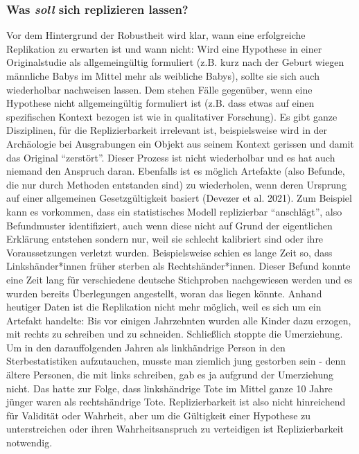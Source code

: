 \documentclass[
  letterpaper,
  DIV=11,
  numbers=noendperiod]{scrreprt}
\begin{document}
\subsubsection{\texorpdfstring{Was \emph{soll} sich replizieren
lassen?}{Was soll sich replizieren lassen?}}\label{was-soll-sich-replizieren-lassen}

Vor dem Hintergrund der Robustheit wird klar, wann eine erfolgreiche
Replikation zu erwarten ist und wann nicht: Wird eine Hypothese in einer
Originalstudie als allgemeingültig formuliert (z.B. kurz nach der Geburt
wiegen männliche Babys im Mittel mehr als weibliche Babys), sollte sie
sich auch wiederholbar nachweisen lassen. Dem stehen Fälle gegenüber,
wenn eine Hypothese nicht allgemeingültig formuliert ist (z.B. dass
etwas auf einen spezifischen Kontext bezogen ist wie in qualitativer
Forschung). Es gibt ganze Disziplinen, für die Replizierbarkeit
irrelevant ist, beispielsweise wird in der Archäologie bei Ausgrabungen
ein Objekt aus seinem Kontext gerissen und damit das Original
``zerstört''. Dieser Prozess ist nicht wiederholbar und es hat auch
niemand den Anspruch daran. Ebenfalls ist es möglich Artefakte (also
Befunde, die nur durch Methoden entstanden sind) zu wiederholen, wenn
deren Ursprung auf einer allgemeinen Gesetzgültigkeit basiert (Devezer
et al. 2021). Zum Beispiel kann es vorkommen, dass ein statistisches
Modell replizierbar ``anschlägt'', also Befundmuster identifiziert, auch
wenn diese nicht auf Grund der eigentlichen Erklärung entstehen sondern
nur, weil sie schlecht kalibriert sind oder ihre Voraussetzungen
verletzt wurden. Beispielsweise schien es lange Zeit so, dass
Linkshänder*innen früher sterben als Rechtshänder*innen. Dieser Befund
konnte eine Zeit lang für verschiedene deutsche Stichproben nachgewiesen
werden und es wurden bereits Überlegungen angestellt, woran das liegen
könnte. Anhand heutiger Daten ist die Replikation nicht mehr möglich,
weil es sich um ein Artefakt handelte: Bis vor einigen Jahrzehnten
wurden alle Kinder dazu erzogen, mit rechts zu schreiben und zu
schneiden. Schließlich stoppte die Umerziehung. Um in den
darauffolgenden Jahren als linkhändrige Person in den Sterbestatistiken
aufzutauchen, musste man ziemlich jung gestorben sein - denn ältere
Personen, die mit links schreiben, gab es ja aufgrund der Umerziehung
nicht. Das hatte zur Folge, dass linkshändrige Tote im Mittel ganze 10
Jahre jünger waren als rechtshändrige Tote. Replizierbarkeit ist also
nicht hinreichend für Validität oder Wahrheit, aber um die Gültigkeit
einer Hypothese zu unterstreichen oder ihren Wahrheitsanspruch zu
verteidigen ist Replizierbarkeit notwendig.
\end{document}
